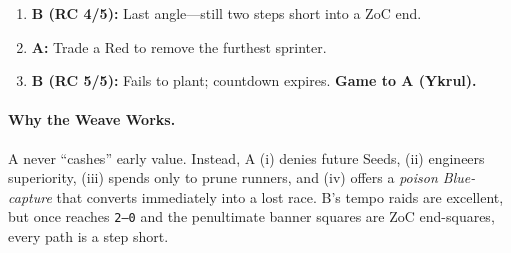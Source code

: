 \documentclass[11pt]{article}
\newcommand{\SC}[1]{\textcolor{red!60!black}{\scriptsize\ttfamily[S:#1]}}
\newcommand{\RC}{\textcolor{purple!70!black}{\scriptsize\ttfamily[RC]}}
\newcommand{\CapC}[1]{\textcolor{green!40!black}{\scriptsize\ttfamily[G:#1]}}
\renewcommand{\RC}[1][]{%
  \textcolor{purple!70!black}{\scriptsize\ttfamily[RC%
  \if\relax\detokenize{#1}\relax\else~#1\fi]}}
\begin{document}
\begin{multicols}{2}
\begin{enumerate}[leftmargin=*,itemsep=0.35em,label=\textbf{M\arabic*:}]
\item \textbf{B (RC 4/5):} Last angle—still two steps short into a ZoC end.

\item \textbf{A:} Trade a Red to remove the furthest sprinter.

\item \textbf{B (RC 5/5):} Fails to plant; countdown expires. \textbf{Game to A (Ykrul).}

\end{enumerate}
\end{multicols}

\paragraph{Why the Weave Works.}
A never “cashes” early value. Instead, A (i) denies future Seeds, (ii) engineers \CapC{} superiority, (iii) spends \SC{} only to prune runners, and (iv) offers a \emph{poison Blue-capture} that converts immediately into a lost \RC{} race. B’s tempo raids are excellent, but once \CapC{} reaches \texttt{2--0} and the penultimate banner squares are ZoC end-squares, every path is a step short.
\end{document}
